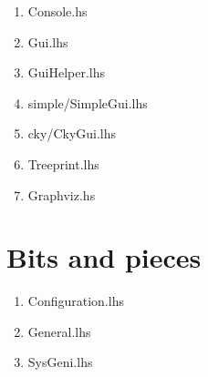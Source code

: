 \documentclass[a4paper,11pt]{report}
\begin{document}
\begin{enumerate}
\item{Console.hs}
\item{Gui.lhs}
\item{GuiHelper.lhs}
\item{simple/SimpleGui.lhs}
\item{cky/CkyGui.lhs}
\item{Treeprint.lhs}
\item{Graphviz.hs}
\end{enumerate}

\section{Bits and pieces}

\begin{enumerate}
\item{Configuration.lhs}
\item{General.lhs}
\item{SysGeni.lhs}
\end{enumerate}

{


}
\end{document}
